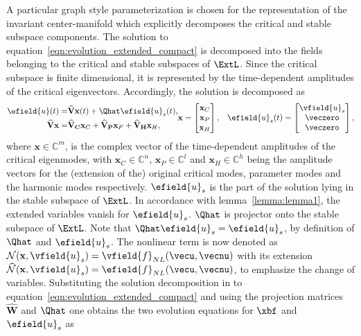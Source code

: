 A particular graph style parameterization is chosen for the representation of the invariant center-manifold which explicitly decomposes the critical and stable subspace components. The solution to equation~\eqref{eqn:evolution_extended_compact} is decomposed into the fields belonging to the critical and stable subspaces of $\ExtL$. Since the critical subspace is finite dimensional, it is represented by the time-dependent amplitudes of the critical eigenvectors. Accordingly, the solution is decomposed as
\begin{subequations}
	\begin{align}
		\efield{u}(t) =& \mathbf{\widehat{V}}\mathbf{x}(t) + \Qhat\efield{u}_{s}(t), \\
		\mathbf{\widehat{V}}\mathbf{x} =& \mathbf{\widehat{V}_{C}}\mathbf{x}_{C} + \mathbf{\widehat{V}_{P}}\mathbf{x}_{P} + \mathbf{\widehat{V}_{H}}\mathbf{x}_{H},  	
	\end{align}
	\begin{align}
		\mathbf{x} = \begin{bmatrix}
			\mathbf{x}_{C} \\
			\mathbf{x}_{P} \\
			\mathbf{x}_{H} 
		\end{bmatrix}, &&
		\efield{u}_{s}(t) = \begin{bmatrix}
			\vfield{u}_{s} \\
			\veczero \\
			\veczero 
		\end{bmatrix}, \nonumber
	\end{align} 
\end{subequations}
where $\mathbf{x} \in \mathds{C}^{m}$, is the complex vector of the time-dependent amplitudes of the critical eigenmodes, with $\mathbf{x}_{C}\in\mathds{C}^{n}$, $\mathbf{x}_{P}\in\mathds{C}^{l}$ and $\mathbf{x}_{H}\in\mathds{C}^{h}$ being the amplitude vectors for the (extension of the) original critical modes, parameter modes and the harmonic modes respectively. $\efield{u}_{s}$ is the part of the solution lying in the stable subspace of $\ExtL$. In accordance with lemma~\ref{lemma:lemma1}, the extended variables vanish for $\efield{u}_{s}$. $\Qhat$ is projector onto the stable subspace of $\ExtL$. Note that $\Qhat\efield{u}_{s} = \efield{u}_{s}$, by definition of $\Qhat$ and $\efield{u}_{s}$. The nonlinear term is now denoted as $\mathcal{N}(\mathbf{x},\vfield{u}_{s}) = \vfield{f}_{NL}(\vecu,\vecnu)$ with its extension $\mathcal{\widehat{N}}(\mathbf{x},\vfield{u}_{s}) = \efield{f}_{NL}(\vecu,\vecnu)$, to emphasize the change of variables. Substituting the solution decomposition in to equation~\eqref{eqn:evolution_extended_compact} and using the projection matrices $\mathbf{\widehat{W}}$ and $\Qhat$ one obtains the two evolution equations for $\xbf$ and $\efield{u}_{s}$ as
